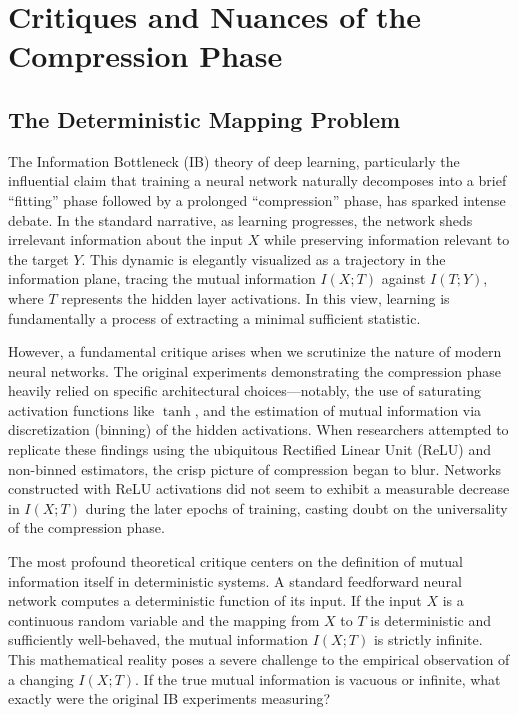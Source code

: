 \chapter{Critiques and Nuances of the Compression Phase}

\section{The Deterministic Mapping Problem}

The Information Bottleneck (IB) theory of deep learning, particularly the influential claim that training a neural network naturally decomposes into a brief ``fitting'' phase followed by a prolonged ``compression'' phase, has sparked intense debate. In the standard narrative, as learning progresses, the network sheds irrelevant information about the input $X$ while preserving information relevant to the target $Y$. This dynamic is elegantly visualized as a trajectory in the information plane, tracing the mutual information $I(X; T)$ against $I(T; Y)$, where $T$ represents the hidden layer activations. In this view, learning is fundamentally a process of extracting a minimal sufficient statistic.

However, a fundamental critique arises when we scrutinize the nature of modern neural networks. The original experiments demonstrating the compression phase heavily relied on specific architectural choices---notably, the use of saturating activation functions like $\tanh$, and the estimation of mutual information via discretization (binning) of the hidden activations. When researchers attempted to replicate these findings using the ubiquitous Rectified Linear Unit (ReLU) and non-binned estimators, the crisp picture of compression began to blur. Networks constructed with ReLU activations did not seem to exhibit a measurable decrease in $I(X; T)$ during the later epochs of training, casting doubt on the universality of the compression phase.

The most profound theoretical critique centers on the definition of mutual information itself in deterministic systems. A standard feedforward neural network computes a deterministic function of its input. If the input $X$ is a continuous random variable and the mapping from $X$ to $T$ is deterministic and sufficiently well-behaved, the mutual information $I(X; T)$ is strictly infinite. This mathematical reality poses a severe challenge to the empirical observation of a changing $I(X; T)$. If the true mutual information is vacuous or infinite, what exactly were the original IB experiments measuring?

